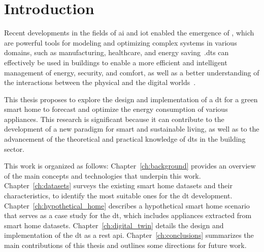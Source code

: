 \chapter{Introduction}\label{ch:introduction}

Recent developments in the fields of \acrfull{ai} and \acrfull{iot} enabled the emergence of , which are powerful tools for modeling and optimizing complex systems in various domains, such as manufacturing, healthcare, and energy saving~\parencite{negriReviewRolesDigital2017,barricelliSurveyDigitalTwin2019,hermannDesignPrinciplesIndustrie2016}.\@ \acrshort{dt}s can effectively be used in buildings to enable a more efficient and intelligent management of energy, security, and comfort, as well as a better understanding of the interactions between the physical and the digital worlds~\parencite{tagliabueLeveragingDigitalTwin2021,yangDigitalTwinsIntelligent2022}.

This thesis proposes to explore the design and implementation of a \acrshort{dt} for a green smart home to forecast and optimize the energy consumption of various appliances. This research is significant because it can contribute to the development of a new paradigm for smart and sustainable living, as well as to the advancement of the theoretical and practical knowledge of \acrshort{dt}s in the building sector.

This work is organized as follows: Chapter~\ref{ch:background} provides an overview of the main concepts and technologies that underpin this work. Chapter~\ref{ch:datasets} surveys the existing smart home datasets and their characteristics, to identify the most suitable ones for the \acrshort{dt} development. Chapter~\ref{ch:hypothetical_home} describes a hypothetical smart home scenario that serves as a case study for the \acrshort{dt}, which includes appliances extracted from smart home datasets. Chapter~\ref{ch:digital_twin} details the design and implementation of the \acrshort{dt} as a \acrshort{rest} \acrshort{api}. Chapter~\ref{ch:conclusions} summarizes the main contributions of this thesis and outlines some directions for future work.